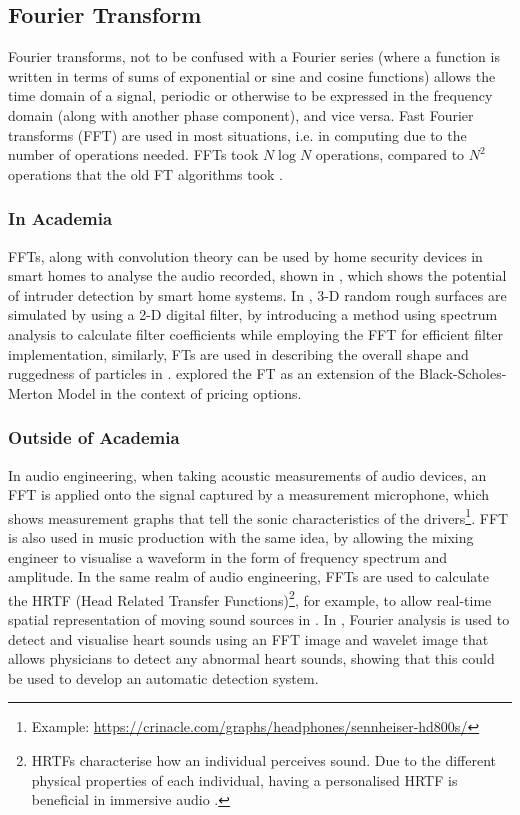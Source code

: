 \documentclass[a4paper, 10pt, conference]{ieeeconf}      %
\begin{document}
\subsection{Fourier Transform} %
Fourier transforms, not to be confused with a Fourier series (where a function is written in terms of sums of exponential or sine and cosine functions) allows the time domain of a signal, periodic or otherwise to be expressed in the frequency domain (along with another phase component), and vice versa. Fast Fourier transforms (FFT) are used in most situations, i.e. in computing due to the number of operations needed. FFTs took $N\log{N}$ operations, compared to $N^2$ operations that the old FT algorithms took \cite{Cooley1969}.
\\
\subsubsection{In Academia} %
FFTs, along with convolution theory can be used by home security devices in smart homes to analyse the audio recorded, shown in \cite{Vadeiadis2020}, which shows the potential of intruder detection by smart home systems. In \cite{Hu1992}, 3-D random rough surfaces are simulated by using a 2-D digital filter, by introducing a method using spectrum analysis to calculate filter coefficients while employing the FFT for efficient filter implementation, similarly, FTs are used in describing the overall shape and ruggedness of particles in \cite{Wettimuny2004}. \cite{Orzechowski2019} explored the FT as an extension of the Black-Scholes-Merton Model in the context of pricing options.
\\
\subsubsection{Outside of Academia} %
In audio engineering, when taking acoustic measurements of audio devices, an FFT is applied onto the signal captured by a measurement microphone, which shows measurement graphs that tell the sonic characteristics of the drivers\footnote{Example: \url{https://crinacle.com/graphs/headphones/sennheiser-hd800s/}}. FFT is also used in music production with the same idea, by allowing the mixing engineer to visualise a waveform in the form of frequency spectrum and amplitude. In the same realm of audio engineering, FFTs are used to calculate the HRTF (Head Related Transfer Functions)\footnote{HRTFs characterise how an individual perceives sound. Due to the different physical properties of each individual, having a personalised HRTF is beneficial in immersive audio \cite{Oehler2023}.}, for example, to allow real-time spatial representation of moving sound sources in \cite{Tsakostas2007}.  In \cite{Nogata2012}, Fourier analysis is used to detect and visualise heart sounds using an FFT image and wavelet image that allows physicians to detect any abnormal heart sounds, showing that this could be used to develop an automatic detection system. 
\end{document}
